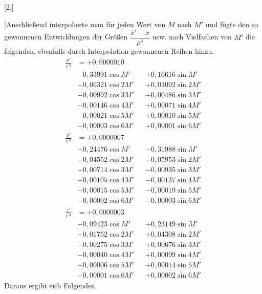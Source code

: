 \clearpage
\begingroup
{}
\renewcommand{\headrulewidth}{0pt}
\clearpage
{}
\begin{center}[2.]\end{center}
\begingroup
\small
\par\noindent\hspace*{\parindent}[Anschließend interpolierte man für jeden Wert von \(M\) nach \(M'\) und fügte den so
gewonnenen Entwicklungen der Größen \(\dfrac{x'-x}{\rho^3}\) usw. nach Vielfachen von \(M'\) die
folgenden, ebenfalls durch Interpolation gewonnenen Reihen hinzu.
\[
\begin{aligned}
\frac{x'}{r^{\prime3}}&=+0{,}0000010&&\\
&-0{,}33991\cos M' && +0{,}16616\sin M'\\
&-0{,}06321\cos 2M' && +0{,}03092\sin 2M'\\
&-0{,}00992\cos 3M' && +0{,}00486\sin 3M'\\
&-0{,}00146\cos 4M' && +0{,}00071\sin 4M'\\
&-0{,}00021\cos 5M' && +0{,}00010\sin 5M'\\
&-0{,}00003\cos 6M' && +0{,}00001\sin 6M'
\end{aligned}
\]
\[
\begin{aligned}
\frac{y'}{r^{\prime3}}&=+0{,}0000007&&\\
&-0{,}24476\cos M' && -0{,}31988\sin M'\\
&-0{,}04552\cos 2M' && -0{,}05953\sin 2M'\\
&-0{,}00714\cos 3M' && -0{,}00935\sin 3M'\\
&-0{,}00105\cos 4M' && -0{,}00137\sin 4M'\\
&-0{,}00015\cos 5M' && -0{,}00019\sin 5M'\\
&-0{,}00002\cos 6M' && -0{,}00003\sin 6M'
\end{aligned}
\]
\[
\begin{aligned}
\frac{z'}{r^{\prime3}}&=+0{,}0000003&&\\
&-0{,}09423\cos M' && +0{,}23149\sin M'\\
&-0{,}01752\cos 2M' && +0{,}04308\sin 2M'\\
&-0{,}00275\cos 3M' && +0{,}00676\sin 3M'\\
&-0{,}00040\cos 4M' && +0{,}00099\sin 4M'\\
&-0{,}00006\cos 5M' && +0{,}00014\sin 5M'\\
&-0{,}00001\cos 6M' && +0{,}00002\sin 6M'
\end{aligned}
\]
Daraus ergibt sich Folgendes.
\par
\endgroup

